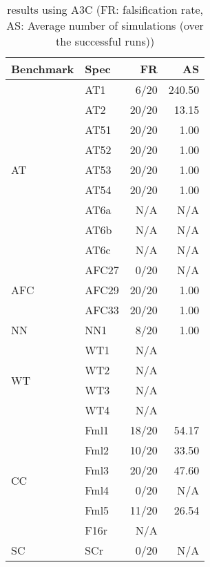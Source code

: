 	\begin{table}[!tb]
		\centering
		\caption{\falsify results using A3C (FR: falsification rate, AS: Average number of simulations (over the successful  runs))}
		\label{table:falsifyA3CResults}
		\begin{tabular}{llrr}
			\toprule
			Benchmark & Spec & FR & AS\\
			\midrule
			\multirow{9}{*}{AT}
			& AT1 & 6/20 & 240.50\\
			& AT2 & 20/20 & 13.15\\
			& AT51 & 20/20 & 1.00\\
			& AT52 & 20/20 & 1.00\\
			& AT53 & 20/20 & 1.00\\
			& AT54 & 20/20 & 1.00\\
			& AT6a & N/A & N/A\\
			& AT6b & N/A & N/A\\
			& AT6c & N/A & N/A\\
			\hline
			\multirow{3}{*}{AFC}
			& AFC27 & 0/20 & N/A\\
			& AFC29 & 20/20 & 1.00\\
			& AFC33 & 20/20 & 1.00\\
			\hline
			NN & NN1 & 8/20 & 1.00\\
			\hline
			\multirow{4}{*}{WT}
			& WT1 & N/A\\
			& WT2 & N/A\\
			& WT3 & N/A\\
			& WT4 & N/A\\
			\hline
			\multirow{6}{*}{CC}
			& Fml1 & 18/20 & 54.17\\
			& Fml2 & 10/20 & 33.50\\
			& Fml3 & 20/20 & 47.60\\
			& Fml4 & 0/20 & N/A\\
			& Fml5 & 11/20 & 26.54\\
			\hline
			F16 & F16r & N/A\\
			\hline
			SC & SCr & 0/20 & N/A\\
			\bottomrule
		\end{tabular}
	\end{table}



